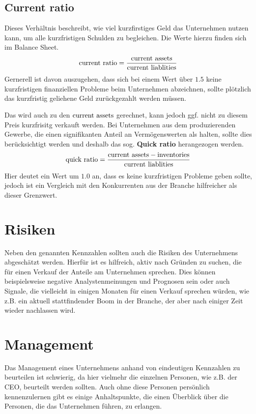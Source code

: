 %
\subsection{Current ratio}

Dieses Verhältnis beschreibt, wie viel kurzfirstiges Geld das Unternehmen nutzen kann, um alle kurzfristigen Schulden zu begleichen.
Die Werte hierzu finden sich im Balance Sheet.
\begin{equation}
    \text{current ratio} = \frac{\text{current assets}}{\text{current liablities}}
\end{equation}
Gernerell ist davon auszugehen, dass sich bei einem Wert über $1.5$ keine kurzfristigen finanziellen Probleme beim Unternehmen abzeichnen, sollte plötzlich das kurzfristig geliehene Geld zurückgezahlt werden müssen.

Das \inventories wird auch zu den $\text{current assets}$ gerechnet, kann jedoch ggf. nicht zu diesem Preis kurzfrisitg verkauft werden. 
Bei Unternehmen aus dem produzierenden Gewerbe, die einen signifikanten Anteil an Vermögenswerten als \inventories halten, sollte dies berücksichtigt werden und deshalb das sog. \textbf{Quick ratio} herangezogen werden.
\begin{equation}
    \text{quick ratio} = \frac{\text{current assets} - \text{inventories}}{\text{current liablities}}
\end{equation}
Hier deutet ein Wert um $1.0$ an, dass es keine kurzfristigen Probleme geben sollte, jedoch ist ein Vergleich mit den Konkurrenten aus der Branche hilfreicher als dieser Grenzwert.

%
\section{Risiken}
Neben den genannten Kennzahlen sollten auch die Risiken des Unternehmens abgeschätzt werden.
Hierfür ist es hilfreich, aktiv nach Gründen zu suchen, die für einen Verkauf der Anteile am Unternehmen sprechen.
Dies können beispielsweise negative Analystenmeinungen und Prognosen sein oder auch Signale, die vielleicht in einigen Monaten für einen Verkauf sprechen würden, wie z.B. ein aktuell stattfindender Boom in der Branche, der aber nach einiger Zeit wieder nachlassen wird.

%
\section{Management}
Das Management eines Unternehmens anhand von eindeutigen Kennzahlen zu beurteilen ist schwierig, da hier vielmehr die einzelnen Personen, wie z.B. der CEO, beurteilt werden sollten.
Auch ohne diese Personen persönlich kennenzulernen gibt es einige Anhaltspunkte, die einen Überblick über die Personen, die das Unternehmen führen, zu erlangen.

